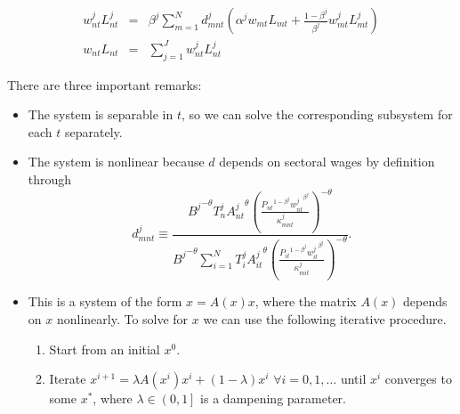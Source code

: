 \documentclass[11pt,oneside,a4paper]{article}
\begin{document}
\begin{eqnarray}
  w_{nt}^j L_{nt}^j &=& \beta^j \sum_{m = 1}^N d_{mnt}^j \left( \alpha^j w_{mt} L_{mt} + \frac{1 - \beta^j}{\beta^j} w_{mt}^j L_{mt}^j\right)\\
  w_{nt} L_{nt} &=& \sum_{j = 1}^J w_{nt}^j L_{nt}^j
\end{eqnarray}

There are three important remarks:
\begin{itemize}
  \item The system is separable in $t$, so we can solve the corresponding subsystem for each $t$ separately.
  \item The system is nonlinear because $d$ depends on sectoral wages by definition through
    $$d_{mnt}^j \equiv \frac{{B^j}^{-\theta} T_n^j {A_{nt}^j}^{\theta} \left(\frac{{P_{nt}}^{1 - \beta^j} {w_{nt}^j}^{\beta^j}}{\kappa_{mnt}^j}\right)^{-\theta}}{{B^j}^{-\theta} \sum_{i = 1}^N T_i^j {A_{it}^j}^{\theta} \left(\frac{{P_{it}}^{1 - \beta^j} {w_{it}^j}^{\beta^j}}{\kappa_{mit}^j}\right)^{-\theta}}.$$
  \item This is a system of the form $x = A(x) x$, where the matrix $A(x)$ depends on $x$ nonlinearly. To solve for $x$ we can use the following iterative procedure.
    \begin{enumerate}
      \item Start from an initial $x^0$.
      \item Iterate $x^{i + 1} = \lambda A(x^i) x^i + (1 - \lambda) x^i$ $\forall i = 0, 1, \dots$ until $x^i$ converges to some $x^*$, where $\lambda \in \left(0,1\right]$ is a dampening parameter.
    \end{enumerate}
\end{itemize}
\end{document}

